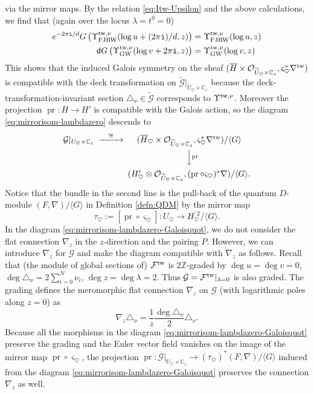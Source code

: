 \documentclass[11pt]{amsart}
\theoremstyle{definition} %
\theoremstyle{remark} %
\newcommand{\CC}{\mathbb C}
\newcommand{\ZZ}{\mathbb Z}
\newcommand{\tw}{{\rm tw}}
\def\GW{\operatorname{\text{GW}}}
\newcommand{\cO}{\mathcal{O}}
\newcommand{\cF}{\mathcal{F}}
\newcommand{\cG}{\mathcal{G}}
\newcommand{\tcG}{\widetilde{\cG}}
\newcommand{\dd}{\mathsf{d}}
\newcommand{\FJRW}{{\operatorname{FJRW}}}
\renewcommand{\GW}{{\operatorname{GW}}}
\newcommand{\pr}{\operatorname{pr}}
\newcommand{\tU}{\widetilde{U}}
\newcommand{\ov}{\overline}
\newcommand{\iu}{\mathtt{i}}
\begin{document}
via the mirror maps. 
By the relation \eqref{eq:Itw-Upsilon} 
and the above calculations, we find that 
(again over the locus $\lambda=t^0=0$) 
\begin{align*}
\begin{split}  
e^{-2\pi\iu/d} G \left( 
\Upsilon_{\FJRW}^{\tw,\nu}(\log u + (2\pi\iu)/d, z) 
\right) 
& = \Upsilon_{\FJRW}^{\tw,\nu}(\log u,z) \\
\dd G \left ( 
\Upsilon_{\GW}^{\tw,\nu} ( \log v + 2\pi\iu ,z) 
\right) 
& = \Upsilon_{\GW}^{\tw,\nu}(\log v,z)  
\end{split} 
\end{align*} 
This shows that the induced Galois symmetry on 
the sheaf $(\ov{H} \times \cO_{\tU_\heartsuit \times \CC_z}, 
\varsigma_\heartsuit^* \nabla^\tw)$ is compatible 
with the deck transformation on $\tcG|_{\tU_\heartsuit\times \CC_z}$ 
because the deck-transformation-invariant section 
$\triangle_\nu\in \tcG$ corresponds to $\Upsilon^{\tw,\nu}$.  
Moreover the projection $\pr \colon \ov{H} \to H'$ is 
compatible with the Galois action, so the diagram 
\eqref{eq:mirrorisom-lambdazero} descends to 
\begin{equation} 
\label{eq:mirrorisom-lambdazero-Galoisquot} 
\begin{CD} 
\cG|_{U_\heartsuit \times \CC_z} @>{\cong}>>  
( \ov{H}_\heartsuit \times \cO_{\tU_\heartsuit \times \CC_z}, 
\varsigma_\heartsuit^*\nabla^\tw)/\langle G  \rangle  \\ 
@. @VV{\pr}V \\ 
@. (H'_\heartsuit \otimes \cO_{\tU_\heartsuit \times \CC_z},  
(\pr \circ \varsigma_\heartsuit)^* \nabla)/
\langle G \rangle. 
\end{CD} 
\end{equation} 
Notice that the bundle in the second line is the 
pull-back of the quantum $D$-module 
$(F, \nabla)/\langle G\rangle$ in Definition \ref{defn:QDM} 
by the mirror map 
\[ 
\tau_\heartsuit := 
[\pr \circ \varsigma_\heartsuit]  
\colon U_\heartsuit \to {H^{\prime \, 2}_\heartsuit}/\langle G\rangle. 
\]
In the diagram \eqref{eq:mirrorisom-lambdazero-Galoisquot}, 
we do not consider the flat connection $\nabla_z$ 
in the $z$-direction and the pairing $P$. 
However, we can introduce $\nabla_z$ for $\cG$ and make 
the diagram compatible with $\nabla_z$ as follows. 
Recall that (the module of global sections of) $\cF^\tw$ is $2\ZZ$-graded by 
$\deg u = \deg v =0$, $\deg \triangle_\nu = 2 \sum_{i=0}^N \nu_i$, 
$\deg z = \deg \lambda =2$. 
Thus $\cG=\cF^\tw|_{\lambda=0}$ is also graded. 
The grading defines the meromorphic flat connection $\nabla_z$ on $\cG$ 
(with logarithmic poles along $z=0$) as 
\[
\nabla_z \triangle_\nu = \frac{1}{z} 
\frac{\deg \triangle_\nu}{2} 
\triangle_\nu. 
\] 
Because all the morphisms in the diagram 
\eqref{eq:mirrorisom-lambdazero-Galoisquot} 
preserve the grading and the Euler vector field 
vanishes on the image of the mirror map 
$\pr \circ \varsigma_\heartsuit$, 
the projection $\pr \colon \cG|_{U_\heartsuit \times \CC_z} 
\to (\tau_\heartsuit)^* 
(F, \nabla)/\langle G \rangle$ 
induced from the diagram \eqref{eq:mirrorisom-lambdazero-Galoisquot}
preserves the connection $\nabla_z$ as well. 
\end{document}

